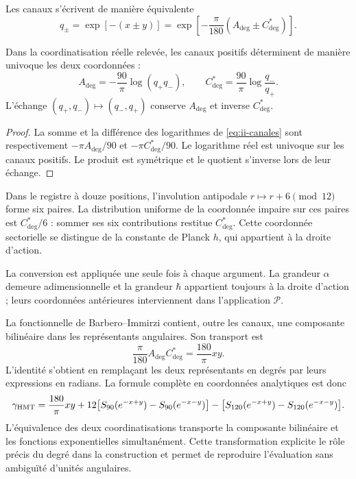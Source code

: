 Les canaux s'écrivent de manière équivalente
\begin{equation}
 q_\pm=\exp[-(x\pm y)]
 =\exp\!\left[-\frac{\pi}{180}(A_{\deg}\pm C^*_{\deg})\right].
\label{eq:ii-canales}
\end{equation}
\begin{proposition}
\label{prop:ii-inversion-canales-angulares}
Dans la coordinatisation réelle relevée, les canaux positifs déterminent
de manière univoque les deux coordonnées :
\[
 A_{\deg}=-\frac{90}{\pi}\log(q_+q_-),\qquad
 C^*_{\deg}=\frac{90}{\pi}\log\frac{q_-}{q_+}.
\]
L'échange \((q_+,q_-)\mapsto(q_-,q_+)\) conserve
\(A_{\deg}\) et inverse \(C^*_{\deg}\).
\end{proposition}
\begin{proof}
La somme et la différence des logarithmes de
\eqref{eq:ii-canales} sont respectivement
\(-\pi A_{\deg}/90\) et \(-\pi C^*_{\deg}/90\).
Le logarithme réel est univoque sur les canaux positifs.
Le produit est symétrique et le quotient s'inverse lors de leur échange.
\end{proof}
Dans le registre à douze positions, l'involution antipodale
\(r\mapsto r+6\pmod {12}\) forme six paires. La distribution
uniforme de la coordonnée impaire sur ces paires est
\(C^*_{\deg}/6\) : sommer ses six contributions restitue
\(C^*_{\deg}\). Cette coordonnée sectorielle se distingue de
la constante de Planck \(h\), qui appartient à la droite d'action.

La conversion est appliquée une seule fois à chaque argument. La grandeur
\(\alpha\) demeure adimensionnelle et la grandeur \(\hbar\)
appartient toujours à la droite d'action ; leurs coordonnées antérieures
interviennent dans l'application \(\mathcal P\).

La fonctionnelle de Barbero--Immirzi contient, outre les canaux, une
composante bilinéaire dans les représentants angulaires. Son transport est
\begin{equation}
 \frac{\pi}{180}A_{\deg}C^*_{\deg}
 =\frac{180}{\pi}xy.
 \label{eq:ii-barbero-cartas}
\end{equation}
L'identité s'obtient en remplaçant les deux représentants en degrés
par leurs expressions en radians. La formule complète en
coordonnées analytiques est donc
\[
 \gamma_{\mathrm{HMT}}
 =\frac{180}{\pi}xy
 +12\bigl[S_{90}(e^{-x+y})-S_{90}(e^{-x-y})\bigr]
 -\bigl[S_{120}(e^{-x+y})-S_{120}(e^{-x-y})\bigr].
\]
L’équivalence des deux coordinatisations transporte la composante bilinéaire
et les fonctions exponentielles simultanément. Cette transformation
explicite le rôle précis du degré dans la construction et permet
de reproduire l’évaluation sans ambiguïté d’unités angulaires.
\par\endgroup
